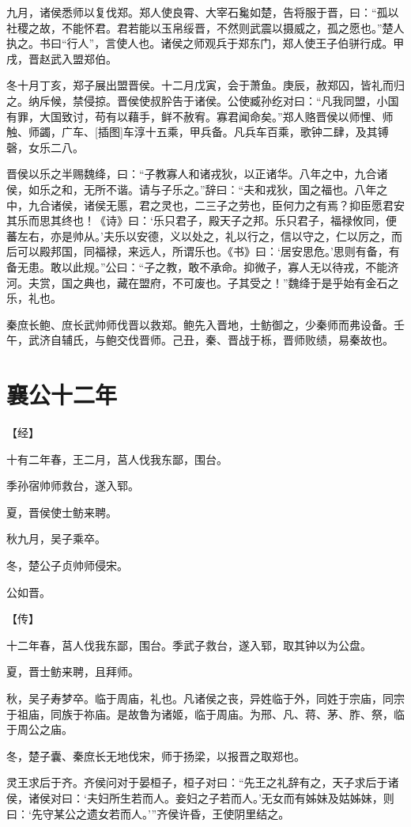 \documentclass[a4paper,12pt,UTF8,twoside]{ctexbook}
\begin{document}
九月，诸侯悉师以复伐郑。郑人使良霄、大宰石毚如楚，告将服于晋，曰：“孤以社稷之故，不能怀君。君若能以玉帛绥晋，不然则武震以摄威之，孤之愿也。”楚人执之。书曰“行人”，言使人也。诸侯之师观兵于郑东门，郑人使王子伯骈行成。甲戌，晋赵武入盟郑伯。

冬十月丁亥，郑子展出盟晋侯。十二月戊寅，会于萧鱼。庚辰，赦郑囚，皆礼而归之。纳斥候，禁侵掠。晋侯使叔肸告于诸侯。公使臧孙纥对曰：“凡我同盟，小国有罪，大国致讨，苟有以藉手，鲜不赦宥。寡君闻命矣。”郑人赂晋侯以师悝、师触、师蠲，广车、[插图]车淳十五乘，甲兵备。凡兵车百乘，歌钟二肆，及其镈磬，女乐二八。

晋侯以乐之半赐魏绛，曰：“子教寡人和诸戎狄，以正诸华。八年之中，九合诸侯，如乐之和，无所不谐。请与子乐之。”辞曰：“夫和戎狄，国之福也。八年之中，九合诸侯，诸侯无慝，君之灵也，二三子之劳也，臣何力之有焉？抑臣愿君安其乐而思其终也！《诗》曰：‘乐只君子，殿天子之邦。乐只君子，福禄攸同，便蕃左右，亦是帅从。’夫乐以安德，义以处之，礼以行之，信以守之，仁以厉之，而后可以殿邦国，同福禄，来远人，所谓乐也。《书》曰：‘居安思危。’思则有备，有备无患。敢以此规。”公曰：“子之教，敢不承命。抑微子，寡人无以待戎，不能济河。夫赏，国之典也，藏在盟府，不可废也。子其受之！”魏绛于是乎始有金石之乐，礼也。

秦庶长鲍、庶长武帅师伐晋以救郑。鲍先入晋地，士鲂御之，少秦师而弗设备。壬午，武济自辅氏，与鲍交伐晋师。己丑，秦、晋战于栎，晋师败绩，易秦故也。

\section{襄公十二年}


【经】

十有二年春，王二月，莒人伐我东鄙，围台。

季孙宿帅师救台，遂入郓。

夏，晋侯使士鲂来聘。

秋九月，吴子乘卒。

冬，楚公子贞帅师侵宋。

公如晋。

【传】

十二年春，莒人伐我东鄙，围台。季武子救台，遂入郓，取其钟以为公盘。

夏，晋士鲂来聘，且拜师。

秋，吴子寿梦卒。临于周庙，礼也。凡诸侯之丧，异姓临于外，同姓于宗庙，同宗于祖庙，同族于祢庙。是故鲁为诸姬，临于周庙。为邢、凡、蒋、茅、胙、祭，临于周公之庙。

冬，楚子囊、秦庶长无地伐宋，师于扬梁，以报晋之取郑也。

灵王求后于齐。齐侯问对于晏桓子，桓子对曰：“先王之礼辞有之，天子求后于诸侯，诸侯对曰：‘夫妇所生若而人。妾妇之子若而人。’无女而有姊妹及姑姊妹，则曰：‘先守某公之遗女若而人。’”齐侯许昏，王使阴里结之。
\end{document}
